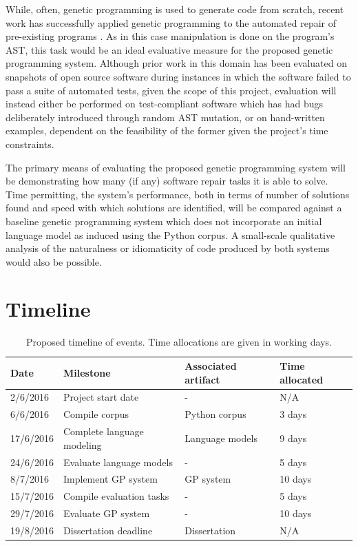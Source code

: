 \documentclass[a4paper,11pt]{proposal}
\begin{document}
While, often, genetic programming is used to generate code from scratch, recent work has successfully applied genetic programming to the automated repair of pre-existing programs \cite{weimer2009}. As in this case manipulation is done on the program's AST, this task would be an ideal evaluative measure for the proposed genetic programming system. Although prior work in this domain has been evaluated on snapshots of open source software during instances in which the software failed to pass a suite of automated tests, given the scope of this project, evaluation will instead either be performed on test-compliant software which has had bugs deliberately introduced through random AST mutation, or on hand-written examples, dependent on the feasibility of the former given the project's time constraints.

The primary means of evaluating the proposed genetic programming system will be demonstrating how many (if any) software repair tasks it is able to solve. Time permitting, the system's performance, both in terms of number of solutions found and speed with which solutions are identified, will be compared against a baseline genetic programming system which does not incorporate an initial language model as induced using the Python corpus. A small-scale qualitative analysis of the naturalness or idiomaticity of code produced by both systems would also be possible.


\section{Timeline}
\begin{table}
\begin{center}
    \begin{tabular}{ l l l l }
    \textbf{Date} & \textbf{Milestone} & \textbf{Associated artifact} & \textbf{Time allocated} \\ \hline
    2/6/2016  & Project start date & - & N/A \\ \hline
    6/6/2016  & Compile corpus & Python corpus & 3 days \\ \hline
    17/6/2016 & Complete language modeling & Language models & 9 days \\ \hline
    24/6/2016 & Evaluate language models & - & 5 days \\  \hline
    8/7/2016 & Implement GP system & GP system & 10 days \\  \hline
    15/7/2016 & Compile evaluation tasks & - & 5 days\\  \hline
    29/7/2016 & Evaluate GP system & - & 10 days \\  \hline
    19/8/2016 & Dissertation deadline & Dissertation & N/A\footnotemark  \\  \hline
    \end{tabular}
    \caption{Proposed timeline of events. Time allocations are given in working days.}
    \label{table:1}
\end{center}
\end{table}
\end{document}
